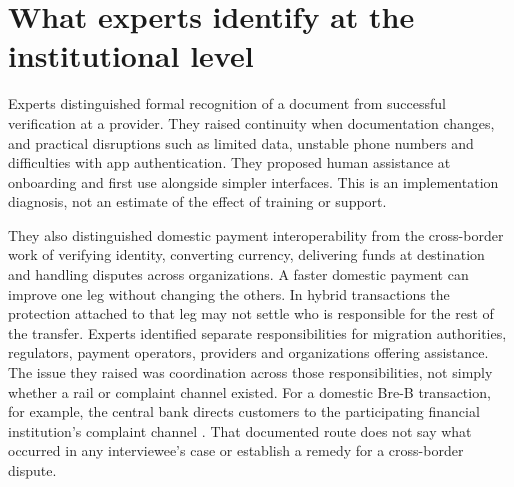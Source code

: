\section{What experts identify at the institutional level}
Experts distinguished formal recognition of a document from successful verification at a provider. They raised continuity when documentation changes, and practical disruptions such as limited data, unstable phone numbers and difficulties with app authentication. They proposed human assistance at onboarding and first use alongside simpler interfaces. This is an implementation diagnosis, not an estimate of the effect of training or support.

They also distinguished domestic payment interoperability from the cross-border work of verifying identity, converting currency, delivering funds at destination and handling disputes across organizations. A faster domestic payment can improve one leg without changing the others. In hybrid transactions the protection attached to that leg may not settle who is responsible for the rest of the transfer. Experts identified separate responsibilities for migration authorities, regulators, payment operators, providers and organizations offering assistance. The issue they raised was coordination across those responsibilities, not simply whether a rail or complaint channel existed. For a domestic Bre-B transaction, for example, the central bank directs customers to the participating financial institution's complaint channel \citep{banrepfaq}. That documented route does not say what occurred in any interviewee's case or establish a remedy for a cross-border dispute.
